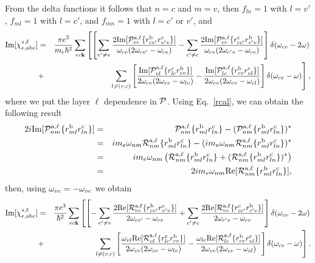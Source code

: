 From the delta functions it follows that $n=c$ and $m=v$, then
$f_{ln}=1$ with $l=v'$,
$f_{ml}=1$ with $l=c'$, 
and
$f_{mn}=1$ with $l=c'$ or $v'$, and
\begin{eqnarray}\label{imchie3}
\mathrm{Im}[\chi_{e,\mathrm{a}\mathrm{b}\mathrm{c}}^{s,\ell}]
&=&
\frac{\pi e^3}{m_e\hbar^2} 
\sum_{vc\mathbf{k}}
\left[
\left[
\sum_{v'\ne v}
\frac{2\mathrm{Im}[{\cal P}^{\mathrm{a},\ell}_{vc}\{r^{\mathrm{b}}_{cv'}r^{\mathrm{c}}_{v'v}\}]
}{\omega_{cv}(2\omega_{cv'}-\omega_{cv})}
-
\sum_{c'\ne c}
\frac{2\mathrm{Im}[{\cal P}^{\mathrm{a},\ell}_{vc}\{r^{\mathrm{c}}_{cc'}r^{\mathrm{b}}_{c'v}\}]}
{\omega_{cv}(2\omega_{c'v}-\omega_{cv})}
\right]
\delta(\omega_{cv}-2\omega)
\right.
\nonumber\\
&+&
\left.
\sum_{l\neq(v,c)}
\left[
\frac{\mathrm{Im}[{\cal P}^{\mathrm{a},\ell}_{vl}\{r^{\mathrm{c}}_{lc}r^{\mathrm{b}}_{cv}\}]}
{2\omega_{cv}(2\omega_{cv}-\omega_{lv})}
-
\frac{\mathrm{Im}[{\cal P}^{\mathrm{a},\ell}_{lc}\{r^{\mathrm{b}}_{cv}r^{\mathrm{c}}_{vl}\}]}
{2\omega_{cv}(2\omega_{cv}-\omega_{cl})}
\right]
\delta(\omega_{cv}-\omega)
\right]
,
\end{eqnarray}  
where we put the layer $\ell$ dependence in ${\cal P}$.
Using Eq.~\eqref{rcal}, we can obtain the following result
\begin{eqnarray}\label{ptor}
2i\mathrm{Im}[{\cal P}^{\mathrm{a},\ell}_{nm}\{r^{\mathrm{b}}_{ml}r^{\mathrm{c}}_{ln}\}]
&=&
{\cal P}^{\mathrm{a},\ell}_{nm}\{r^{\mathrm{b}}_{ml}r^{\mathrm{c}}_{ln}\}
-
({\cal P}^{\mathrm{a},\ell}_{nm}\{r^{\mathrm{b}}_{ml}r^{\mathrm{c}}_{ln}\})^*
\nonumber\\
&=&
im_e\omega_{nm}{\cal R}^{\mathrm{a},\ell}_{nm}\{r^{\mathrm{b}}_{ml}r^{\mathrm{c}}_{ln}\}
-
(im_e\omega_{nm}{\cal R}^{\mathrm{a},\ell}_{nm}\{r^{\mathrm{b}}_{ml}r^{\mathrm{c}}_{ln}\})^*
\nonumber\\
&=&
im_e\omega_{nm}\left({\cal R}^{\mathrm{a},\ell}_{nm}\{r^{\mathrm{b}}_{ml}r^{\mathrm{c}}_{ln}\}
+
({\cal R}^{\mathrm{a},\ell}_{nm}\{r^{\mathrm{b}}_{ml}r^{\mathrm{c}}_{ln}\})^*
\right)
\nonumber\\
&=&
2im_e\omega_{nm}\mathrm{Re}[{\cal R}^{\mathrm{a},\ell}_{nm}\{r^{\mathrm{b}}_{ml}r^{\mathrm{c}}_{ln}\}]
,
\end{eqnarray}
then, using $\omega_{vc}=-\omega_{vc}$ we obtain
\begin{eqnarray}\label{imchie3n}
\mathrm{Im}[\chi_{e,\mathrm{a}\mathrm{b}\mathrm{c}}^{s,\ell}]
&=&
\frac{\pi e^3}{\hbar^2} 
\sum_{vc\mathbf{k}}
\left[
\left[
-\sum_{v'\ne v}
\frac{2\mathrm{Re}[{\cal R}^{\mathrm{a},\ell}_{vc}\{r^{\mathrm{b}}_{cv'}r^{\mathrm{c}}_{v'v}\}]
}{2\omega_{cv'}-\omega_{cv}}
+
\sum_{c'\ne c}
\frac{2\mathrm{Re}[{\cal R}^{\mathrm{a},\ell}_{vc}\{r^{\mathrm{c}}_{cc'}r^{\mathrm{b}}_{c'v}\}]}
{2\omega_{c'v}-\omega_{cv}}
\right]
\delta(\omega_{cv}-2\omega)
\right.
\nonumber\\
&+&
\left.
\sum_{l\neq(v,c)}
\left[
\frac{\omega_{vl}\mathrm{Re}[{\cal R}^{\mathrm{a},\ell}_{vl}\{r^{\mathrm{c}}_{lc}r^{\mathrm{b}}_{cv}\}]}
{2\omega_{cv}(2\omega_{cv}-\omega_{lv})}
-
\frac{\omega_{lc}\mathrm{Re}[{\cal R}^{\mathrm{a},\ell}_{lc}\{r^{\mathrm{b}}_{cv}r^{\mathrm{c}}_{vl}\}]}
{2\omega_{cv}(2\omega_{cv}-\omega_{cl})}
\right]
\delta(\omega_{cv}-\omega)
\right]
.
\end{eqnarray}  
